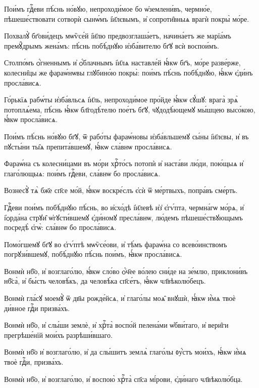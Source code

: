 \hKv Пои́мъ гдⷭ҇еви пѣ́снь но́вꙋю, непроходи́мое бо ѡ҆землени́въ,  чермно́е, пѣшеше́ствовати сотворѝ сынѡ́мъ і҆и҃лєвымъ, и҆  сопроти̑вныѧ врагѝ покры̀ мо́ре. 

\hKv Похвалꙋ̀ бг҃ови́децъ мѡѷсе́й і҆и҃лю предвозглаша́етъ, начина́етъ  же марїа́мъ премꙋ̑дрымъ  жена́мъ: пѣ́снь  побѣ́днꙋю и҆зба́вителю бг҃ꙋ всѝ воспои́мъ. 

\hKv Столпо́мъ ѻ҆́гненнымъ и҆ ѻ҆́блачнымъ і҆и҃лѧ наставле́й ꙗ҆́кѡ  бг҃ъ, мо́ре разве́рже, колесни̑цы же фараѡ́нѡвы глꙋбино́ю покры̀:  пои́мъ пѣ́снь побѣ́днꙋю, ꙗ҆́кѡ є҆ди́нъ просла́висѧ. 

\hKv Го́рькїѧ рабѡ́ты и҆зба́вльсѧ і҆и҃ль, непроходи́мое про́йде ꙗ҆́кѡ  сꙋ́шꙋ: врага̀ зрѧ̀ потоплѧ́ема, пѣ́снь ꙗ҆́кѡ бл҃годѣ́телю пое́тъ  бг҃ꙋ, чꙋдодѣ́ющемꙋ мы́шцею высо́кою, ꙗ҆́кѡ просла́висѧ. 

\hKv Пои́мъ пѣ́снь но́вꙋю бг҃ꙋ, ѿ рабо́ты фараѡ́новы и҆зба́вльшемꙋ  сы́ны і҆и҃лєвы, и҆ въ пꙋсты́ни ты̑ѧ препита́вшемꙋ, ꙗ҆́кѡ сла́внѡ  просла́висѧ. 

\hKv Фараѡ́на съ колесни́цами въ мо́ри хрⷭ҇то́съ потопѝ и҆ наста́ви  лю́ди, пою́щыѧ и҆ глаго́лющыѧ: пои́мъ гдⷭ҇еви, сла́внѡ бо  просла́висѧ. 

\hKv Вознесꙋ̀ тѧ̀ бж҃е сп҃се мо́й, ꙗ҆́кѡ воскре́слъ є҆сѝ ѿ  ме́ртвыхъ, попра́въ сме́рть.  

\hKv Гдⷭ҇еви пои́мъ побѣ́днꙋю пѣ́снь, во и҆схо́дѣ і҆и҃левѣ и҆з̾  є҆гѵ́пта, чермна́гѡ мо́рѧ, и҆ і҆ѻрда́на стрꙋи̑ ѡ҆гꙋсти́вшемꙋ  є҆ди́номꙋ пресла́внѡ, лю́демъ пѣшеше́ствꙋющымъ посредѣ̀ є҆гѡ̀:  сла́внѡ бо просла́висѧ. 

\hKv Помо́гшемꙋ бг҃ꙋ во є҆гѵ́птѣ мѡѷсе́ови, и҆ тѣ́мъ фараѡ́на со  всево́инствомъ погрꙋзи́вшемꙋ, побѣ́днꙋю пѣ́снь пои́мъ, ꙗ҆́кѡ  просла́висѧ. 
%

\hKv Вонмѝ нб҃о, и҆ возглаго́лю, ꙗ҆́кѡ сло́во ѻ҆́ч҃ее во́лею сни́де  на зе́млю, приклони́въ нб҃са̀, и҆ бы́сть человѣ́къ, да человѣ́ка  сп҃се́тъ, ꙗ҆́кѡ чл҃вѣколю́бецъ. 

\hKv Вонмѝ гла́сꙋ моемꙋ̀ ѿ дв҃ы рожде́йсѧ, и҆ глаго́лы моѧ̑  внꙋшѝ, ꙗ҆́кѡ и҆́мѧ твоѐ ди́вное гдⷭ҇и призва́хъ. 

\hKv Вонмѝ нб҃о, и҆ слы́ши землѐ, и҆ хрⷭ҇та̀ воспо́й пелена́ми  ѡ҆бви́таго, и҆ вери̑ги прегрѣше́нїй мои́хъ разрѣши́вшаго.  

\hKv Вонмѝ нб҃о и҆ возглаго́лю, и҆ да слы́шитъ землѧ̀ глаго́лы  ᲂу҆́стъ мои́хъ, ꙗ҆́кѡ и҆́мѧ твоѐ гдⷭ҇и, призва́хъ. 

\hKv Вонмѝ нб҃о, и҆ возглаго́лю, и҆ воспою̀ хрⷭ҇та̀ сп҃са мі́рови,  є҆ди́наго чл҃вѣколю́бца. 

